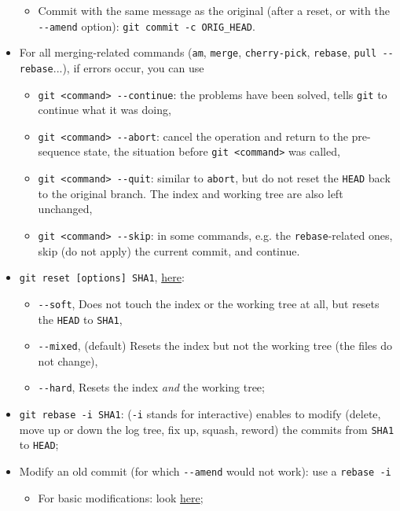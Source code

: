 \documentclass[a4paper,12pt,%
              final%
              ]{article}
\begin{document}
\begin{itemize}
\begin{itemize}
      \item Commit with the same message as the original (after a reset, or with the \verb|--amend| option): \verb|git commit -c ORIG_HEAD|.
    \end{itemize}
  \item For all merging-related commands (\texttt{am}, \texttt{merge}, \texttt{cherry-pick}, \texttt{rebase}, \verb|pull --rebase|...), if errors occur, you can use
    \begin{itemize}
      \item \verb|git <command> --continue|: the problems have been solved, tells \texttt{git} to continue what it was doing,
      \item \verb|git <command> --abort|: cancel the operation and return to the pre-sequence state, the situation before \texttt{git <command>} was called,
      \item \verb|git <command> --quit|: similar to \texttt{abort}, but do not reset the \texttt{HEAD} back to the original branch. The index and working tree are also left unchanged,
      \item \verb|git <command> --skip|: in some commands, e.g. the \texttt{rebase}-related ones, skip (do not apply) the current commit, and continue.
    \end{itemize}
  \item \verb|git reset [options] SHA1|, \href{https://git-scm.com/docs/git-reset}{here}:
    \begin{itemize}
      \item \verb|--soft|, Does not touch the index or the working tree at all, but resets the \texttt{HEAD} to \texttt{SHA1},
      \item \verb|--mixed|, (default) Resets the index but not the working tree (the files do not change),
      \item \verb|--hard|, Resets the index \emph{and} the working tree;
    \end{itemize}
  \item \verb|git rebase -i SHA1|: (\texttt{-i} stands for interactive) enables to modify (delete, move up or down the log tree, fix up, squash, reword) the commits from \texttt{SHA1} to \texttt{HEAD};
  \item Modify an old commit (for which \verb|--amend| would not work): use a \texttt{rebase -i}
    \begin{itemize}
      \item For basic modifications: look \href{https://stackoverflow.com/questions/1186535/how-to-modify-a-specified-commit}{here};

\end{itemize}
\end{itemize}
\end{document}
